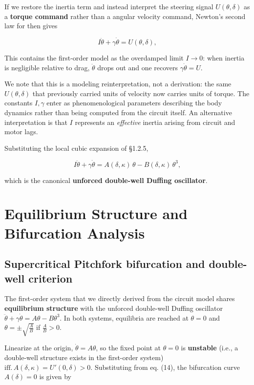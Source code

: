 \documentclass[11pt]{article}
\begin{document}
If we restore the inertia term and instead interpret the steering signal $U(\theta,\delta)$ as a \textbf{torque command} rather than a angular velocity command, Newton's second law for then gives

\begin{equation}
I \ddot{\theta} + \gamma \dot{\theta} = U(\theta,\delta),
\end{equation}

This contains the first-order model as the overdamped limit $I \to 0$: when inertia is negligible relative to drag, $\ddot\theta$ drops out and one recovers $\gamma\dot\theta = U$.

We note that this is a modeling reinterpretation, not a derivation: the same $U(\theta, \delta)$ that previously carried units of velocity now carries units of torque. The constants $I, \gamma$ enter as phenomenological parameters describing the body dynamics rather than being computed from the circuit itself. An alternative interpretation is that $I$ represents an \textit{effective} inertia arising from circuit and motor lags.

Substituting the local cubic expansion of §1.2.5,

\begin{equation}
I\ddot\theta + \gamma\dot\theta = A(\delta, \kappa)\,\theta - B(\delta, \kappa)\,\theta^3,
\end{equation}

which is the canonical \textbf{unforced double-well Duffing oscillator}.

\section{Equilibrium Structure and Bifurcation Analysis}

\subsection{Supercritical Pitchfork bifurcation and double-well criterion}

The first-order system that we directly derived from the circuit model shares \textbf{equilibrium structure} with the unforced double-well Duffing oscillator $\ddot{\theta}+\gamma \dot{\theta}=A\theta-B\theta^{3}$. In both systems, equilibria are reached at $\theta=0$ and $\theta=\pm \sqrt{ \frac{A}{B} }$ if $\frac{A}{B}>0$.

Linearize at the origin, $\dot{\theta}=A\theta$, so the fixed point at $\theta = 0$ is \textbf{unstable} (i.e., a double-well structure exists in the first-order system) $\text{iff.}\, A(\delta,\kappa) = U'(0, \delta) > 0$. Substituting from eq. (14), the bifurcation curve $A(\delta) = 0$ is given by
\end{document}
